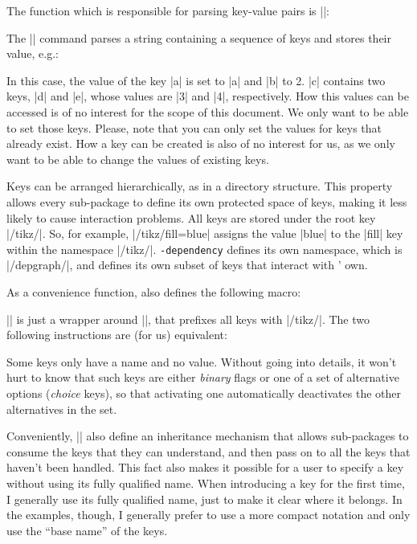 \documentclass[a4paper]{ltxdoc}
\def\pkgname{\tikzname{}\texttt{-dependency}}
\begin{document}
The function which is responsible for parsing key-value pairs is |\pgfkeys|:

\begin{command}{\pgfkeys{}}
   The |\pgfkeys| command parses a string containing a sequence of keys and stores their value, e.g.:
\begin{codeexample}
\end{codeexample}
In this case, the value of the key |a| is set to |a| and |b| to 2. |c| contains two keys, |d| and |e|, whose values are |3| and |4|, respectively. How this values can be accessed is of no interest for the scope of this document. We only want to be able to set those keys. Please, note that you can only set the values for keys that already exist. How a key can be created is also of no interest for us, as we only want to be able to change the values of existing keys.
\end{command}

Keys can be arranged hierarchically, as in a directory structure. This property allows every sub-package to define its own protected space of keys, making it less likely to cause interaction problems. All \tikzname{} keys are stored under the root key |/tikz/|. So, for example, |/tikz/fill=blue| assigns the value |blue| to the |fill| key within the namespace |/tikz/|. \pkgname{} defines its own namespace, which is |/depgraph/|, and defines its own subset of keys that interact with \tikzname{}' own. 

As a convenience function, \tikzname{} also defines the following macro:

\begin{command}{\tikzset{}}
   |\tikzset| is just a wrapper around |\pgfkeys|, that prefixes all keys with |/tikz/|. The two following instructions are (for us) equivalent:
\begin{codeexample}
   \tikzset{text=red, fill=white}
\end{codeexample}
\end{command}

Some keys only have a name and no value. Without going into details, it won't hurt to know that such keys are either \emph{binary} flags or one of a set of alternative options (\emph{choice} keys), so that activating one automatically deactivates the other alternatives in the set.

Conveniently, |\pgfkeys| also define an inheritance mechanism that allows sub-packages to consume the keys that they can understand, and then pass on to \tikzname{} all the keys that haven't been handled. This fact also makes it possible for a user to specify a key without using its fully qualified name. When introducing a key for the first time, I generally use its fully qualified name, just to make it clear where it belongs. In the examples, though, I generally prefer to use a more compact notation and only use the ``base name'' of the keys.
\end{document}
